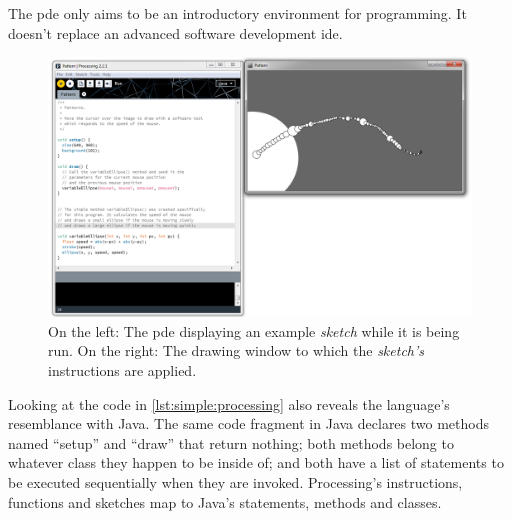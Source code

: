 \documentclass{./llncs2e/llncs}
\begin{document}
	The \ac{pde} only aims to be an introductory environment for programming. 
	It doesn't replace an advanced software development \ac{ide}.
	
	\begin{figure}
		\centering
		\includegraphics[width=1.0\textwidth]{img/proc_dev_env}
		\caption{On the left: The \ac{pde} displaying an example \emph{sketch} while it is being run. On the right: The drawing window to which the \emph{sketch's} instructions are applied.}
		\label{fig:proc:dev:env}
	\end{figure} 
	
	Looking at the code in \ref{lst:simple:processing} also reveals the language's resemblance with Java. 
	The same code fragment in Java declares two methods named ``setup'' and ``draw'' that return nothing; both methods belong to whatever class they happen to be inside of; and both have a list of statements to be executed sequentially when they are invoked. 
	Processing's instructions, functions and sketches map to Java's statements, methods and classes.
	
\end{document}
